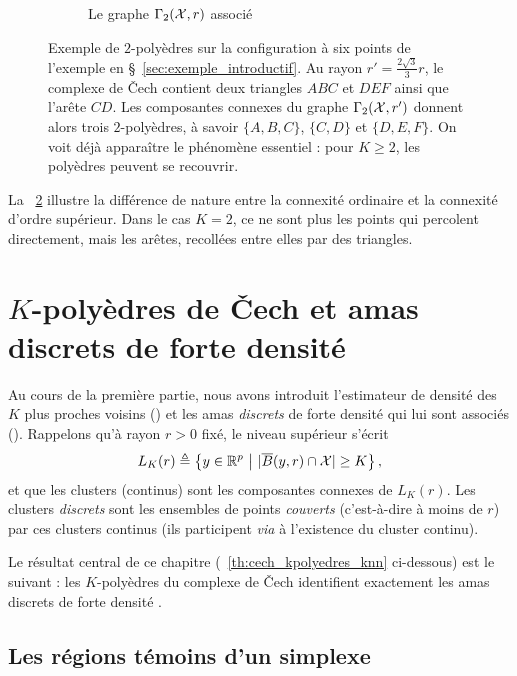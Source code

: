 \begin{figure}[!ht]
\begin{subfigure}[b]{0.48\textwidth}
        \caption{Le graphe $\Gamma_2(\mathcal{X},r)$ associé}
        \label{fig:chap2_gamma2_exemple}
    \end{subfigure}
    \caption{Exemple de $2$-polyèdres sur la configuration à six points de l'exemple en \S~\ref{sec:exemple_introductif}. Au rayon $r'=\frac{2\sqrt 3}{3}r$, le complexe de \v Cech contient deux triangles $ABC$ et $DEF$ ainsi que l'arête $CD$. Les composantes connexes du graphe $\Gamma_2(\mathcal{X},r')$ donnent alors trois $2$-polyèdres, à savoir $\{A,B,C\}$, $\{C,D\}$ et $\{D,E,F\}$. On voit déjà apparaître le phénomène essentiel : pour $K\ge 2$, les polyèdres peuvent se recouvrir.}
    \label{fig:chap2_exemple_kpolyedres}
\end{figure}

La \Fig~\ref{fig:chap2_exemple_kpolyedres} illustre la différence de nature entre la connexité ordinaire et la connexité d'ordre supérieur. Dans le cas $K=2$, ce ne sont plus les points qui percolent directement, mais les arêtes, recollées entre elles par des triangles.

\section{$K$-polyèdres de \v Cech et amas discrets de forte densité \KNN}
\label{sec:correspondance_KPolydres_KNN}


Au cours de la première partie, nous avons introduit l'estimateur \KNN de densité des $K$ plus proches voisins (\Def[def:K-NN]) et les amas \emph{discrets} de forte densité qui lui sont associés (). Rappelons qu'à rayon $r>0$ fixé, le niveau supérieur s'écrit
\[
    L_K(r) \triangleq \left\{ y\in\mathbb R^p \ \middle|\ \lvert \overline B(y,r)\cap \mathcal{X} \rvert\ge K \right\},
\]
et que les clusters ({continus}) sont les composantes connexes de $L_K(r)$. Les clusters \emph{discrets} sont les ensembles de points \emph{couverts} (c'est-à-dire à moins de $r$) par ces clusters continus (ils participent \emph{via} \KNN à l'existence du cluster continu).

Le résultat central de ce chapitre (\Th~\ref{th:cech_kpolyedres_knn} ci-dessous) est le suivant : les $K$-polyèdres du complexe de \v Cech identifient exactement les amas discrets de forte densité \KNN.

\subsection{Les régions témoins d'un simplexe}

